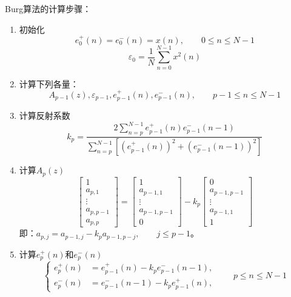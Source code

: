 \documentclass[11pt,a4paper]{ctexart}
\begin{document}
Burg算法的计算步骤：
\begin{enumerate}
\item 初始化
\begin{displaymath}
e^{+}_{0}(n)=e^{-}_{0}(n)=x(n), \qquad 0\leqslant n \leqslant N-1 
\end{displaymath}
\begin{displaymath}
\varepsilon_{0}=\frac{1}{N}\sum^{N-1}_{n=0} x^{2}(n)
\end{displaymath}

\item 计算下列各量：
\begin{displaymath}
A_{p-1}(z), \varepsilon_{p-1}, e^{+}_{p-1}(n),  e^{-}_{p-1}(n), \qquad p-1\leqslant n \leqslant N-1
\end{displaymath}


\item 计算反射系数
\begin{displaymath}
k_{p}=\frac{\displaystyle 2\sum^{N-1}_{n=p} e^{+}_{p-1}(n)e^{-}_{p-1}(n-1)}{\displaystyle \sum^{N-1}_{n=p}[(e^{+}_{p-1}(n))^{2}+(e^{-}_{p-1}(n-1))^{2}]}
\end{displaymath}

\item 计算$A_{p}(z)$
\begin{displaymath}
\left[ \begin{array}{c}
1 \\
a_{p,1} \\
\vdots \\
a_{p,p-1} \\
a_{p,p} \end{array} \right]
=
\left[ \begin{array}{c}
1 \\
a_{p-1,1} \\
\vdots \\
a_{p-1,p-1} \\
0 \end{array} \right]
- k_{p}
\left[ \begin{array}{c}
0 \\
a_{p-1,p-1} \\
\vdots \\
a_{p-1,1} \\
1 \end{array} \right]
\end{displaymath}
即：$a_{p,j}=a_{p-1,j}-k_{p}a_{p-1,p-j},\qquad j\leqslant p-1$。

\item 计算$e^{+}_{p}(n)$和$e^{-}_{p}(n)$
\begin{displaymath}
\left\{ \begin{array}{ll}
e^{+}_{p}(n) & =e^{+}_{p-1}(n)-k_{p}e^{-}_{p-1}(n-1),\\
e^{-}_{p}(n) & =e^{-}_{p-1}(n-1)-k_{p}e^{+}_{p-1}(n),
\end{array}
\qquad p \leqslant n \leqslant N-1 \right.
\end{displaymath}


\end{enumerate}
\end{document}
